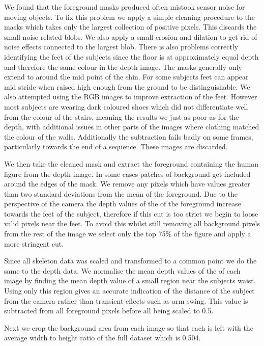 \documentclass[11pt]{article} %
\begin{document}
We found that the foreground masks produced often mistook sensor noise for moving objects. To fix this problem we apply a simple cleaning procedure to the masks which takes only the largest collection of positive pixels. This discards the small noise related blobs. We also apply a small erosion and dilation to get rid of noise effects connected to the largest blob. There is also problems correctly identifying the feet of the subjects since the floor is at approximately equal depth and therefore the same colour in the depth image. The masks generally only extend to around the mid point of the shin. For some subjects feet can appear mid stride when raised high enough from the ground to be distinguishable. We also attempted using the RGB images to improve extraction of the feet. However most subjects are wearing dark coloured shoes which did not differentiate well from the colour of the stairs, meaning the results we just as poor as for the depth, with additional issues in other parts of the images where clothing matched the colour of the walls. Additionally the subtraction fails badly on some frames, particularly towards the end of a sequence. These images are discarded. 

We then take the cleaned mask and extract the foreground containing the human figure from the depth image. In some cases patches of background get included around the edges of the mask. We remove any pixels which have values greater than two standard deviations from the mean of the foreground. Due to the perspective of the camera the depth values of the of the foreground increase towards the feet of the subject, therefore if this cut is too strict we begin to loose valid pixels near the feet. To avoid this whilst still removing all background pixels from the rest of the image we select only the top 75\% of the figure and apply a more stringent cut. 

Since all skeleton data was scaled and transformed to a common point we do the same to the depth data. We normalise the mean depth values of the of each image by finding the mean depth value of a small region near the subjects waist. Using only this region gives an accurate indication of the distance of the subject from the camera rather than transient effects such as arm swing. This value is subtracted from all foreground pixels before all being scaled to 0.5. 

Next we crop the background area from each image so that each is left with the average width to height ratio of the full dataset which is 0.504.
\end{document}
